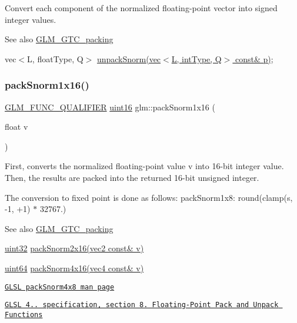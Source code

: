 Convert each component of the normalized floating-\/point vector into signed integer values.

\begin{DoxySeeAlso}{See also}
\hyperlink{group__gtc__packing}{G\+L\+M\+\_\+\+G\+T\+C\+\_\+packing} 

vec$<$\+L, float\+Type, Q$>$ \hyperlink{group__gtc__packing_ga6d49b31e5c3f9df8e1f99ab62b999482}{unpack\+Snorm(vec$<$\+L, int\+Type, Q$>$ const\& p)}; 
\end{DoxySeeAlso}
\mbox{\label{group__gtc__packing_gac29411d6c0f6ed0fe9f0396dfe92e0e8}} 
\subsubsection{\texorpdfstring{pack\+Snorm1x16()}{packSnorm1x16()}}
{\footnotesize\ttfamily \hyperlink{setup_8hpp_a33fdea6f91c5f834105f7415e2a64407}{G\+L\+M\+\_\+\+F\+U\+N\+C\+\_\+\+Q\+U\+A\+L\+I\+F\+I\+ER} \hyperlink{group__gtc__type__precision_gad8c2939e1fdd8e5828b31d95c52255d5}{uint16} glm\+::pack\+Snorm1x16 (\begin{DoxyParamCaption}\item[{float}]{v }\end{DoxyParamCaption})}

First, converts the normalized floating-\/point value v into 16-\/bit integer value. Then, the results are packed into the returned 16-\/bit unsigned integer.

The conversion to fixed point is done as follows\+: pack\+Snorm1x8\+: round(clamp(s, -\/1, +1) $\ast$ 32767.)

\begin{DoxySeeAlso}{See also}
\hyperlink{group__gtc__packing}{G\+L\+M\+\_\+\+G\+T\+C\+\_\+packing} 

\hyperlink{group__gtc__type__precision_ga202b6a53c105fcb7e531f9b443518451}{uint32} \hyperlink{group__core__func__packing_ga977ab172da5494e5ac63e952afacfbe2}{pack\+Snorm2x16(vec2 const\& v)} 

\hyperlink{group__gtc__type__precision_gae3632bf9b37da66233d78930dd06378a}{uint64} \hyperlink{group__gtc__packing_ga9b237d7c66b7a71964e6d1f4dc06539f}{pack\+Snorm4x16(vec4 const\& v)} 

\href{http://www.opengl.org/sdk/docs/manglsl/xhtml/packSnorm4x8.xml}{\tt G\+L\+SL pack\+Snorm4x8 man page} 

\href{http://www.opengl.org/registry/doc/GLSLangSpec.4.20.8.pdf}{\tt G\+L\+SL 4.. specification, section 8. Floating-\/\+Point Pack and Unpack Functions} 
\end{DoxySeeAlso}
\mbox{\label{group__gtc__packing_ga26b6cd7a35c46c4b6a342f3b97b47423}} 
